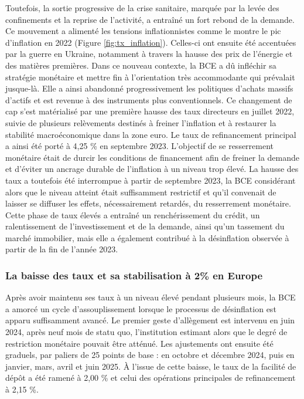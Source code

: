 Toutefois, la sortie progressive de la crise sanitaire, marquée par la levée des confinements et la reprise de l'activité, a entraîné un fort rebond de la demande. Ce mouvement a alimenté les tensions inflationnistes comme le montre le pic d'inflation en 2022 (Figure \ref{fig:tx_inflation}). Celles-ci ont ensuite été accentuées par la guerre en Ukraine, notamment à travers la hausse des prix de l'énergie et des matières premières. Dans ce nouveau contexte, la BCE a dû infléchir sa stratégie monétaire et mettre fin à l'orientation très accommodante qui prévalait jusque-là. Elle a ainsi abandonné progressivement les politiques d'achats massifs d'actifs et est revenue à des instruments plus conventionnels. Ce changement de cap s'est matérialisé par une première hausse des taux directeurs en juillet 2022, suivie de plusieurs relèvements destinés à freiner l'inflation et à restaurer la stabilité macroéconomique dans la zone euro. Le taux de refinancement principal a ainsi été porté à 4,25 \% en septembre 2023. L'objectif de se resserrement monétaire était de durcir les conditions de financement afin de freiner la demande et d'éviter un ancrage durable de l'inflation à un niveau trop élevé. La hausse des taux a toutefois été interrompue à partir de septembre 2023, la BCE considérant alors que le niveau atteint était suffisamment restrictif et qu'il convenait de laisser se diffuser les effets, nécessairement retardés, du resserrement monétaire. Cette phase de taux élevés a entraîné un renchérissement du crédit, un ralentissement de l'investissement et de la demande, ainsi qu'un tassement du marché immobilier, mais elle a également contribué à la désinflation observée à partir de la fin de l'année 2023.

\subsubsection{La baisse des taux et sa stabilisation à 2\% en Europe}

Après avoir maintenu ses taux à un niveau élevé pendant plusieurs mois, la BCE a amorcé un cycle d'assouplissement lorsque le processus de désinflation est apparu suffisamment avancé. Le premier geste d'allègement est intervenu en juin 2024, après neuf mois de statu quo, l'institution estimant alors que le degré de restriction monétaire pouvait être atténué. Les ajustements ont ensuite été graduels, par paliers de 25 points de base : en octobre et décembre 2024, puis en janvier, mars, avril et juin 2025. À l'issue de cette baisse, le taux de la facilité de dépôt a été ramené à 2,00 \% et celui des opérations principales de refinancement à 2,15 \%.

